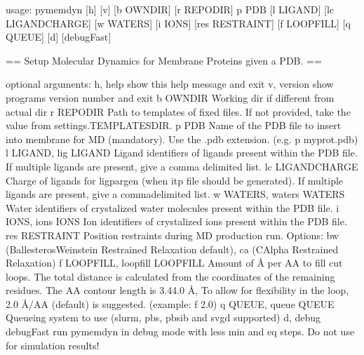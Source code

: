 \documentclass[letterpaper,10pt,english]{sphinxmanual}
\begin{document}
\begin{sphinxVerbatim}[commandchars=\\\{\}]
usage: pymemdyn [\PYGZhy{}h] [\PYGZhy{}v] [\PYGZhy{}b OWN\PYGZus{}DIR] [\PYGZhy{}r REPO\PYGZus{}DIR] \PYGZhy{}p PDB [\PYGZhy{}l LIGAND]
                [\PYGZhy{}\PYGZhy{}lc LIGAND\PYGZus{}CHARGE] [\PYGZhy{}w WATERS] [\PYGZhy{}i IONS] [\PYGZhy{}\PYGZhy{}res RESTRAINT]
                [\PYGZhy{}f LOOP\PYGZus{}FILL] [\PYGZhy{}q QUEUE] [\PYGZhy{}d] [\PYGZhy{}\PYGZhy{}debugFast]

== Setup Molecular Dynamics for Membrane Proteins given a PDB. ==

optional arguments:
  \PYGZhy{}h, \PYGZhy{}\PYGZhy{}help            show this help message and exit
  \PYGZhy{}v, \PYGZhy{}\PYGZhy{}version         show program\PYGZsq{}s version number and exit
  \PYGZhy{}b OWN\PYGZus{}DIR            Working dir if different from actual dir
  \PYGZhy{}r REPO\PYGZus{}DIR           Path to templates of fixed files. If not provided,
                        take the value from settings.TEMPLATES\PYGZus{}DIR.
  \PYGZhy{}p PDB                Name of the PDB file to insert into membrane for MD
                        (mandatory). Use the .pdb extension. (e.g. \PYGZhy{}p
                        myprot.pdb)
  \PYGZhy{}l LIGAND, \PYGZhy{}\PYGZhy{}lig LIGAND
                        Ligand identifiers of ligands present within the PDB
                        file. If multiple ligands are present, give a comma\PYGZhy{}
                        delimited list.
  \PYGZhy{}\PYGZhy{}lc LIGAND\PYGZus{}CHARGE    Charge of ligands for ligpargen (when itp file should
                        be generated). If multiple ligands are present, give a
                        comma\PYGZhy{}delimited list.
  \PYGZhy{}w WATERS, \PYGZhy{}\PYGZhy{}waters WATERS
                        Water identifiers of crystalized water molecules
                        present within the PDB file.
  \PYGZhy{}i IONS, \PYGZhy{}\PYGZhy{}ions IONS  Ion identifiers of crystalized ions present within the
                        PDB file.
  \PYGZhy{}\PYGZhy{}res RESTRAINT       Position restraints during MD production run. Options:
                        bw (Ballesteros\PYGZhy{}Weinstein Restrained Relaxation \PYGZhy{}
                        default), ca (C\PYGZhy{}Alpha Restrained Relaxation)
  \PYGZhy{}f LOOP\PYGZus{}FILL, \PYGZhy{}\PYGZhy{}loop\PYGZus{}fill LOOP\PYGZus{}FILL
                        Amount of Å per AA to fill cut loops. The total
                        distance is calculated from the coordinates of the
                        remaining residues. The AA contour length is 3.4\PYGZhy{}4.0
                        Å, To allow for flexibility in the loop, 2.0 Å/AA
                        (default) is suggested. (example: \PYGZhy{}f 2.0)
  \PYGZhy{}q QUEUE, \PYGZhy{}\PYGZhy{}queue QUEUE
                        Queueing system to use (slurm, pbs, pbs\PYGZus{}ib and svgd
                        supported)
  \PYGZhy{}d, \PYGZhy{}\PYGZhy{}debug
  \PYGZhy{}\PYGZhy{}debugFast           run pymemdyn in debug mode with less min and eq steps.
                        Do not use for simulation results!
\end{sphinxVerbatim}
\end{document}
